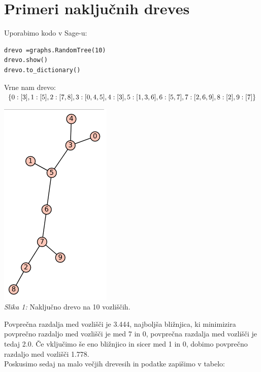 \documentclass[a4paper,10pt]{article}
\begin{document}

\section{Primeri naključnih dreves}

Uporabimo kodo v Sage-u:
\begin{verbatim}
drevo =graphs.RandomTree(10)
drevo.show()
drevo.to_dictionary()
\end{verbatim}
Vrne nam drevo:$ \lbrace 0: [3], 1: [5], 2: [7, 8], 3: [0, 4, 5], 4: [3], \\ 5: [1, 3, 6], 6: [5, 7], 7: [2, 6, 9], 8: [2], 9: [7] \rbrace$
\begin{center}
\includegraphics[scale = 0.6]{graf1}\\ 
\scriptsize{\textit{Slika 1: } Naključno drevo na 10 vozliščih.}
\end{center}
Povprečna razdalja med vozlišči je 3.444, najboljša bližnjica, ki minimizira povprečno razdaljo med vozlišči je med 7 in 0, povprečna razdalja med vozlišči je tedaj 2.0. Če vključimo še eno bližnjico in sicer med 1 in 0, dobimo povprečno razdaljo med vozlišči 1.778.
\\[0.5cm]
Poskusimo sedaj na malo večjih drevesih in podatke zapišimo v tabelo:
\end{document}
